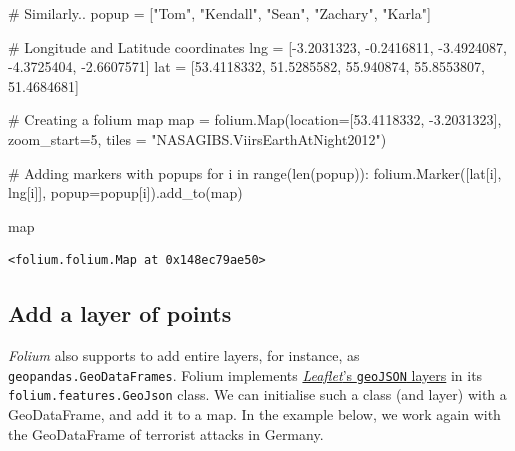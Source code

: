 \documentclass[
  letterpaper,
  DIV=11,
  numbers=noendperiod]{scrreprt}
\newenvironment{Shaded}{\begin{snugshade}}{\end{snugshade}}
\newcommand{\BuiltInTok}[1]{\textcolor[rgb]{0.00,0.23,0.31}{#1}}
\newcommand{\CommentTok}[1]{\textcolor[rgb]{0.37,0.37,0.37}{#1}}
\newcommand{\ControlFlowTok}[1]{\textcolor[rgb]{0.00,0.23,0.31}{#1}}
\newcommand{\DecValTok}[1]{\textcolor[rgb]{0.68,0.00,0.00}{#1}}
\newcommand{\FloatTok}[1]{\textcolor[rgb]{0.68,0.00,0.00}{#1}}
\newcommand{\KeywordTok}[1]{\textcolor[rgb]{0.00,0.23,0.31}{#1}}
\newcommand{\NormalTok}[1]{\textcolor[rgb]{0.00,0.23,0.31}{#1}}
\newcommand{\OperatorTok}[1]{\textcolor[rgb]{0.37,0.37,0.37}{#1}}
\newcommand{\StringTok}[1]{\textcolor[rgb]{0.13,0.47,0.30}{#1}}
\begin{document}
\begin{Shaded}
\begin{Highlighting}[]
\CommentTok{\# Similarly..}
\NormalTok{popup }\OperatorTok{=}\NormalTok{ [}\StringTok{"Tom"}\NormalTok{, }\StringTok{"Kendall"}\NormalTok{, }\StringTok{"Sean"}\NormalTok{, }\StringTok{"Zachary"}\NormalTok{, }\StringTok{"Karla"}\NormalTok{]}

\CommentTok{\# Longitude and Latitude coordinates}
\NormalTok{lng }\OperatorTok{=}\NormalTok{ [}\OperatorTok{{-}}\FloatTok{3.2031323}\NormalTok{, }\OperatorTok{{-}}\FloatTok{0.2416811}\NormalTok{, }\OperatorTok{{-}}\FloatTok{3.4924087}\NormalTok{, }\OperatorTok{{-}}\FloatTok{4.3725404}\NormalTok{, }\OperatorTok{{-}}\FloatTok{2.6607571}\NormalTok{]}
\NormalTok{lat }\OperatorTok{=}\NormalTok{ [}\FloatTok{53.4118332}\NormalTok{, }\FloatTok{51.5285582}\NormalTok{, }\FloatTok{55.940874}\NormalTok{, }\FloatTok{55.8553807}\NormalTok{, }\FloatTok{51.4684681}\NormalTok{]}

\CommentTok{\# Creating a folium map}
\BuiltInTok{map} \OperatorTok{=}\NormalTok{ folium.Map(location}\OperatorTok{=}\NormalTok{[}\FloatTok{53.4118332}\NormalTok{, }\OperatorTok{{-}}\FloatTok{3.2031323}\NormalTok{], zoom\_start}\OperatorTok{=}\DecValTok{5}\NormalTok{, tiles }\OperatorTok{=} \StringTok{"NASAGIBS.ViirsEarthAtNight2012"}\NormalTok{)}

\CommentTok{\# Adding markers with popups}
\ControlFlowTok{for}\NormalTok{ i }\KeywordTok{in} \BuiltInTok{range}\NormalTok{(}\BuiltInTok{len}\NormalTok{(popup)):}
\NormalTok{    folium.Marker([lat[i], lng[i]], popup}\OperatorTok{=}\NormalTok{popup[i]).add\_to(}\BuiltInTok{map}\NormalTok{)}

\BuiltInTok{map}
\end{Highlighting}
\end{Shaded}

\begin{verbatim}
<folium.folium.Map at 0x148ec79ae50>
\end{verbatim}

\hypertarget{add-a-layer-of-points}{%
\subsection{Add a layer of points}\label{add-a-layer-of-points}}

\emph{Folium} also supports to add entire layers, for instance, as
\texttt{geopandas.GeoDataFrames}. Folium implements
\href{https://leafletjs.com/reference.html\#geojson}{\emph{Leaflet}'s
\texttt{geoJSON} layers} in its \texttt{folium.features.GeoJson} class.
We can initialise such a class (and layer) with a GeoDataFrame, and add
it to a map. In the example below, we work again with the GeoDataFrame
of terrorist attacks in Germany.
\end{document}
